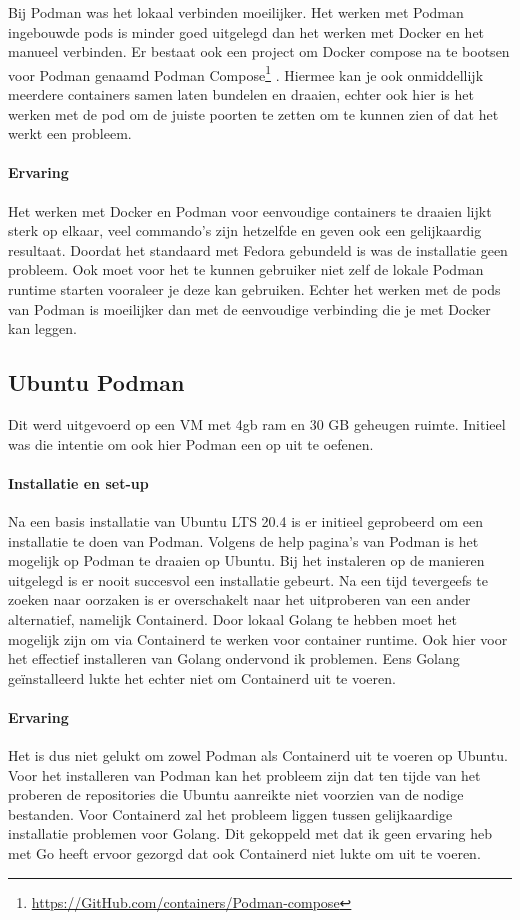 Bij Podman was het lokaal verbinden moeilijker. Het werken met Podman ingebouwde pods is minder goed uitgelegd dan het werken met Docker en het manueel verbinden.  Er bestaat ook een project om Docker compose na te bootsen voor Podman genaamd Podman Compose\footnote{\url{https://GitHub.com/containers/Podman-compose}} .  Hiermee kan je ook onmiddellijk meerdere containers samen laten bundelen en draaien, echter ook hier is het werken met de pod om de juiste poorten te zetten om te kunnen zien of dat het werkt een probleem.

\paragraph{Ervaring}
Het werken met Docker en Podman voor eenvoudige containers te draaien lijkt sterk op elkaar, veel commando’s zijn hetzelfde en geven ook een gelijkaardig resultaat. Doordat het standaard met Fedora gebundeld is was de installatie geen probleem. Ook moet voor het te kunnen gebruiker niet zelf de lokale Podman runtime starten vooraleer je deze kan gebruiken. Echter het werken met de pods van Podman is moeilijker dan met de eenvoudige verbinding die je met Docker kan leggen.

\subsection{Ubuntu Podman}
Dit werd uitgevoerd op een VM met 4gb ram en 30 GB geheugen ruimte. Initieel was die intentie om ook hier Podman een op uit te oefenen.

\paragraph{Installatie en set-up}
Na een basis installatie van Ubuntu LTS 20.4 is er initieel geprobeerd om een installatie te doen van Podman. Volgens de help pagina’s van Podman is het mogelijk op Podman te draaien op Ubuntu. Bij het instaleren op de manieren uitgelegd is er nooit succesvol een installatie gebeurt. Na een tijd tevergeefs te zoeken naar oorzaken is er overschakelt naar het uitproberen van een ander alternatief, namelijk Containerd.
Door lokaal Golang te hebben moet het mogelijk zijn om via Containerd te werken voor container runtime. Ook hier voor het effectief installeren van Golang ondervond ik problemen.  Eens Golang geïnstalleerd lukte het echter niet om Containerd uit te voeren.

\paragraph{Ervaring}
Het is dus niet gelukt om zowel Podman als Containerd uit te voeren op Ubuntu. Voor het installeren van Podman kan het probleem zijn dat ten tijde van het proberen de repositories die Ubuntu aanreikte niet voorzien van de nodige bestanden. Voor Containerd zal het probleem liggen tussen gelijkaardige installatie problemen voor Golang. Dit gekoppeld met dat ik geen ervaring heb met Go heeft ervoor gezorgd dat ook Containerd niet lukte om uit te voeren.

